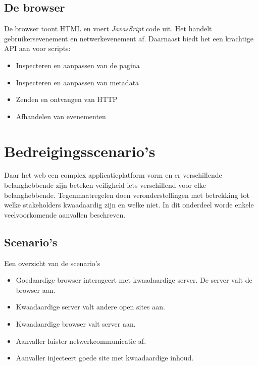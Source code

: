 \documentclass[../main.tex]{subfiles}
\begin{document}
\subsection{De browser}
De browser toont HTML en voert \textit{JavasSript} code uit. Het handelt gebruikersevenement en netwerkevenement af. Daarnaast biedt het een krachtige API aan voor scripts:
\begin{multicols}{2}
\begin{itemize}
	\item Inspecteren en aanpassen van de pagina
	\item Inspecteren en aanpassen van metadata
	\item Zenden en ontvangen van HTTP
	\item Afhandelen van evenementen
\end{itemize} 
\end{multicols}

\section{Bedreigingsscenario's}
Daar het web een complex applicatieplatform vorm en er verschillende belanghebbende zijn beteken veiligheid iets verschillend voor elke belanghebbende. Tegenmaatregelen doen veronderstellingen met betrekking tot welke stakeholders kwaadaardig zijn en welke niet. In dit onderdeel worde enkele veelvoorkomende aanvallen beschreven.

\subsection{Scenario's}
Een overzicht van de scenario's
\begin{itemize}
	\item Goedaardige browser interageert met kwaadaardige server. De server valt de browser aan.
	\item Kwaadaardige server valt andere open sites aan.
	\item Kwaadaardige browser valt server aan.
	\item Aanvaller luister netwerkcommunicatie af.
	\item Aanvaller injecteert goede site met kwaadaardige inhoud.
\end{itemize}
\end{document}
